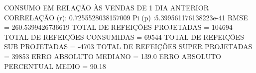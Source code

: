 \documentclass[	12pt, Times, openright, twoside, a4paper, english, brazil]{abntex2}
\begin{document}
                    CONSUMO EM RELAÇÃO ÀS VENDAS DE 1 DIA ANTERIOR\newline
                    CORRELAÇÃO (r): 0.7255528038157009\newline
                    Pi (p) :5.399561176138223e-41\newline
                    RMSE = 260.5399426736619\newline
                    TOTAL DE REFEIÇÕES PROJETADAS = 104694\newline 
                    TOTAL DE REFEIÇÕES CONSUMIDAS = 69544\newline
                    TOTAL DE REFEIÇÕES SUB PROJETADAS = -4703\newline 
                    TOTAL DE REFEIÇÕES SUPER PROJETADAS = 39853\newline 
                    ERRO ABSOLUTO MEDIANO = 139.0\newline 
                    ERRO ABSOLUTO PERCENTUAL MEDIO = 90.18%
                    
\end{document}

